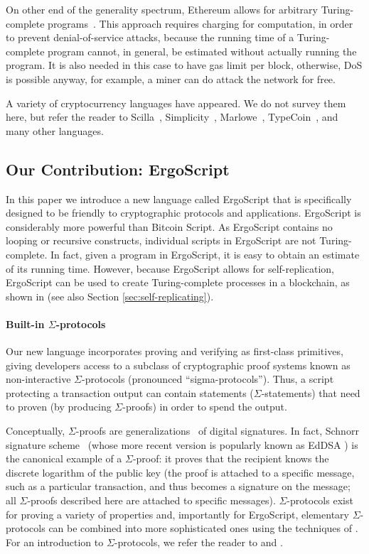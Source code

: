 \documentclass[11pt]{article}
\newcommand{\langname}{ErgoScript\xspace}
\begin{document}
On other end of the generality spectrum, Ethereum allows for arbitrary Turing-complete programs~\cite{wood2014ethereum}. This approach requires charging for computation, in order to prevent denial-of-service attacks, because the running time of a Turing-complete program cannot, in general, be estimated without actually running the program. It is also needed in this case to have gas limit per block, otherwise, DoS is possible anyway, for example, a miner can do attack the network for free.

A variety of cryptocurrency languages have appeared. We do not survey them here, but refer the reader to Scilla~\cite{Scilla},
Simplicity~\cite{o2017simplicity}, Marlowe~\cite{seijas2018marlowe}, TypeCoin~\cite{crary2015peer}, and many other languages.

\subsection{Our Contribution: \langname}
In this paper we introduce a new language called \langname that is specifically designed to be friendly to cryptographic protocols and applications. \langname is considerably more powerful than Bitcoin Script. As \langname contains no looping or recursive constructs, individual scripts in \langname are not Turing-complete.  In fact, given a program in \langname, it is easy to obtain an estimate of its running time. However, because \langname allows for self-replication, \langname can be used to create Turing-complete processes in a blockchain, as shown in \cite{CKM18} (see also Section \ref{sec:self-replicating}).


\paragraph{Built-in $\Sigma$-protocols}

Our new language incorporates proving and verifying as first-class primitives, giving developers access to a subclass of cryptographic proof systems known as non-interactive $\Sigma$-protocols (pronounced ``sigma-protocols'').   Thus, a script protecting a transaction output can contain statements ($\Sigma$-statements) that need to proven (by producing $\Sigma$-proofs) in order to spend the output.

Conceptually, $\Sigma$-proofs \cite{Cra96} are generalizations~\cite{CL06} of digital signatures.
In fact, Schnorr signature scheme~\cite{Sch91} (whose more recent version is popularly known as EdDSA \cite{BDLSY12,rfc8032}) is the canonical example of a $\Sigma$-proof: it proves that the recipient knows the discrete logarithm of the public key (the proof is attached to a specific message, such as a particular transaction, and thus becomes a signature on the message; all $\Sigma$-proofs described here are attached to specific messages). $\Sigma$-protocols exist for proving a variety of properties and, importantly for \langname, elementary $\Sigma$-protocols can be combined into more sophisticated ones using the techniques of \cite{CDS94}. For an introduction to $\Sigma$-protocols, we refer the reader to \cite{Dam10} and \cite[Chapter 6]{HL10}.
\end{document}
